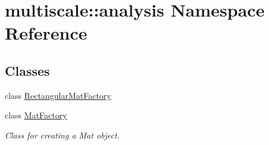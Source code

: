 \hypertarget{namespacemultiscale_1_1analysis}{\section{multiscale\-:\-:analysis Namespace Reference}
\label{namespacemultiscale_1_1analysis}
}
\subsection*{Classes}
\begin{DoxyCompactItemize}
\item 
class \hyperlink{classmultiscale_1_1analysis_1_1RectangularMatFactory}{Rectangular\-Mat\-Factory}
\item 
class \hyperlink{classmultiscale_1_1analysis_1_1MatFactory}{Mat\-Factory}
\begin{DoxyCompactList}\small\item\em Class for creating a Mat object. \end{DoxyCompactList}\end{DoxyCompactItemize}
